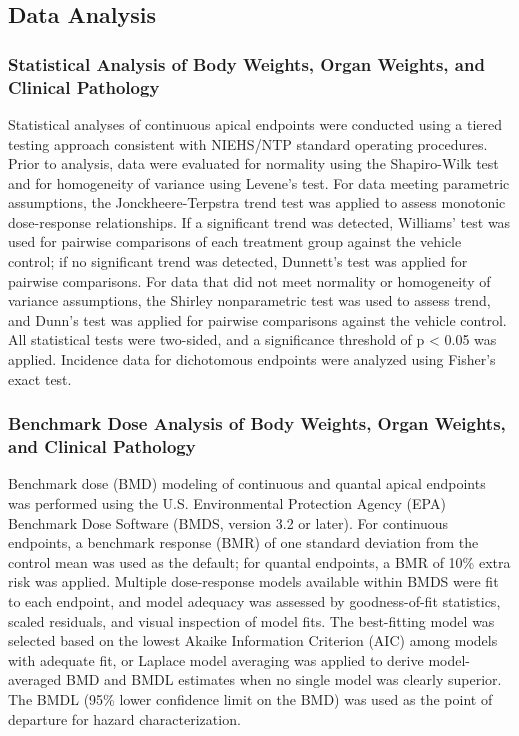 \subsection{Data Analysis}

\subsubsection{Statistical Analysis of Body Weights, Organ Weights, and Clinical Pathology}

Statistical analyses of continuous apical endpoints were conducted using a tiered testing approach consistent with NIEHS/NTP standard operating procedures. Prior to analysis, data were evaluated for normality using the Shapiro-Wilk test and for homogeneity of variance using Levene's test. For data meeting parametric assumptions, the Jonckheere-Terpstra trend test was applied to assess monotonic dose-response relationships. If a significant trend was detected, Williams' test was used for pairwise comparisons of each treatment group against the vehicle control; if no significant trend was detected, Dunnett's test was applied for pairwise comparisons. For data that did not meet normality or homogeneity of variance assumptions, the Shirley nonparametric test was used to assess trend, and Dunn's test was applied for pairwise comparisons against the vehicle control. All statistical tests were two-sided, and a significance threshold of p < 0.05 was applied. Incidence data for dichotomous endpoints were analyzed using Fisher's exact test.

\subsubsection{Benchmark Dose Analysis of Body Weights, Organ Weights, and Clinical Pathology}

Benchmark dose (BMD) modeling of continuous and quantal apical endpoints was performed using the U.S. Environmental Protection Agency (EPA) Benchmark Dose Software (BMDS, version 3.2 or later). For continuous endpoints, a benchmark response (BMR) of one standard deviation from the control mean was used as the default; for quantal endpoints, a BMR of 10\% extra risk was applied. Multiple dose-response models available within BMDS were fit to each endpoint, and model adequacy was assessed by goodness-of-fit statistics, scaled residuals, and visual inspection of model fits. The best-fitting model was selected based on the lowest Akaike Information Criterion (AIC) among models with adequate fit, or Laplace model averaging was applied to derive model-averaged BMD and BMDL estimates when no single model was clearly superior. The BMDL (95\% lower confidence limit on the BMD) was used as the point of departure for hazard characterization.

